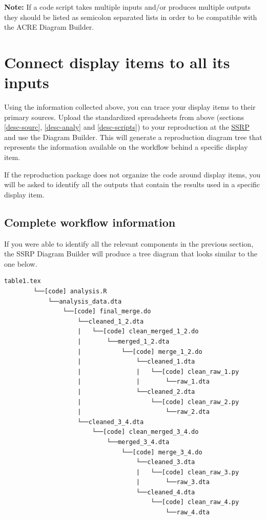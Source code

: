 \documentclass[]{book}
\begin{document}
\textbf{Note:} If a code script takes multiple inputs and/or produces multiple outputs they should be listed as semicolon separated lists in order to be compatible with the ACRE Diagram Builder.

\hypertarget{diagram}{%
\section{Connect display items to all its inputs}\label{diagram}}

Using the information collected above, you can trace your display items to their primary sources. Upload the standardized spreadsheets from above (sections \ref{desc-sourc}, \ref{desc-analy} and \ref{desc-scripts}) to your reproduction at the \href{https://www.socialsciencereproduction.org}{SSRP} and use the Diagram Builder. This will generate a reproduction diagram tree that represents the information available on the workflow behind a specific display item.

If the reproduction package does not organize the code around display items, you will be asked to identify all the outputs that contain the results used in a specific display item.

\hypertarget{complete-tree}{%
\subsection{Complete workflow information}\label{complete-tree}}

If you were able to identify all the relevant components in the previous section, the SSRP Diagram Builder will produce a tree diagram that looks similar to the one below.

\begin{verbatim}
table1.tex
        └──[code] analysis.R
            └──analysis_data.dta
                └──[code] final_merge.do
                    └──cleaned_1_2.dta
                    |   └──[code] clean_merged_1_2.do
                    |       └──merged_1_2.dta
                    |           └──[code] merge_1_2.do
                    |               └──cleaned_1.dta
                    |               |   └──[code] clean_raw_1.py
                    |               |       └──raw_1.dta
                    |               └──cleaned_2.dta
                    |                   └──[code] clean_raw_2.py
                    |                       └──raw_2.dta
                    └──cleaned_3_4.dta
                        └──[code] clean_merged_3_4.do
                            └──merged_3_4.dta
                                └──[code] merge_3_4.do
                                    └──cleaned_3.dta
                                    |   └──[code] clean_raw_3.py
                                    |       └──raw_3.dta
                                    └──cleaned_4.dta
                                        └──[code] clean_raw_4.py
                                            └──raw_4.dta
\end{verbatim}
\end{document}
